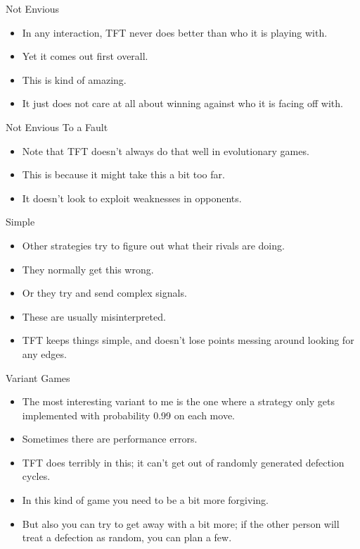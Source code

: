 \documentclass[
  ignorenonframetext,
]{beamer}
\providecommand{\tightlist}{%
  \setlength{\itemsep}{0pt}\setlength{\parskip}{0pt}}
\begin{document}
\begin{frame}{Not Envious}
\protect\hypertarget{not-envious}{}
\begin{itemize}
\tightlist
\item
  In any interaction, TFT never does better than who it is playing with.
\item
  Yet it comes out first overall.
\item
  This is kind of amazing.
\item
  It just does not care at all about winning against who it is facing
  off with.
\end{itemize}
\end{frame}

\begin{frame}{Not Envious To a Fault}
\protect\hypertarget{not-envious-to-a-fault}{}
\begin{itemize}
\tightlist
\item
  Note that TFT doesn't always do that well in evolutionary games.
\item
  This is because it might take this a bit too far.
\item
  It doesn't look to exploit weaknesses in opponents.
\end{itemize}
\end{frame}

\begin{frame}{Simple}
\protect\hypertarget{simple}{}
\begin{itemize}
\tightlist
\item
  Other strategies try to figure out what their rivals are doing.
\item
  They normally get this wrong. \pause
\item
  Or they try and send complex signals.
\item
  These are usually misinterpreted. \pause
\item
  TFT keeps things simple, and doesn't lose points messing around
  looking for any edges.
\end{itemize}
\end{frame}

\begin{frame}{Variant Games}
\protect\hypertarget{variant-games}{}
\begin{itemize}
\tightlist
\item
  The most interesting variant to me is the one where a strategy only
  gets implemented with probability 0.99 on each move.
\item
  Sometimes there are performance errors.
\item
  TFT does terribly in this; it can't get out of randomly generated
  defection cycles.
\item
  In this kind of game you need to be a bit more forgiving.
\item
  But also you can try to get away with a bit more; if the other person
  will treat a defection as random, you can plan a few.
\end{itemize}
\end{frame}
\end{document}
